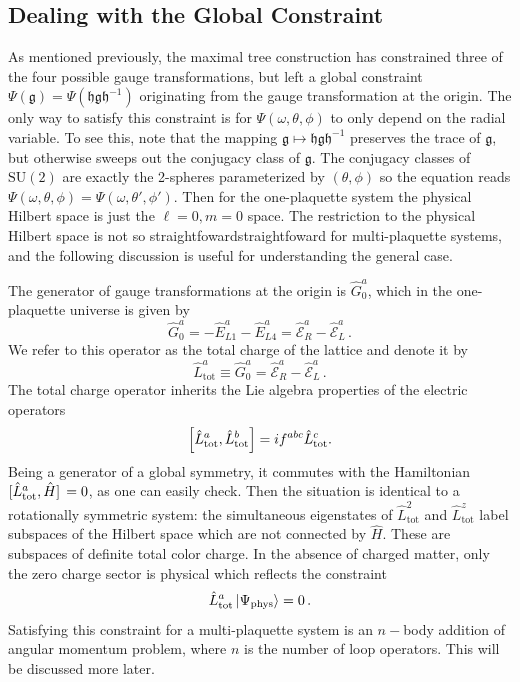 \documentclass[reprint,superscriptaddress,pra,nofootinbib,preprintnumbers,floatfix]{revtex4-1}
\providecommand{\sutwo}{$\mathrm{SU}(2)$\xspace}
\providecommand{\g}{{\mathfrak{g}}}
\providecommand{\h}{{\mathfrak{h}}}
\begin{document}
\subsection{Dealing with the Global Constraint}


As mentioned previously, the maximal tree construction has constrained three of the four possible gauge transformations, but left a global constraint $\Psi(\g) = \Psi(\h\g\h^{-1})$ originating from the gauge transformation at the origin. 
%
The only way to satisfy this constraint is for $\Psi(\omega,\theta,\phi)$ to only depend on the radial variable. 
%
To see this, note that the mapping $\g \mapsto \h\g\h^{-1}$ preserves the trace of $\g$, but otherwise sweeps out the conjugacy class of $\g$. 
%
The conjugacy classes of \sutwo are exactly the 2-spheres parameterized by $(\theta,\phi)$ so the equation reads $\Psi(\omega,\theta,\phi) = \Psi(\omega,\theta',\phi')$.  
%
Then for the one-plaquette system the physical Hilbert space is just the $\ell=0,m=0$ space. 
%
The restriction to the physical Hilbert space is not so straightfowardstraightfoward for multi-plaquette systems, and the following discussion is useful for understanding the general case.   



The generator of gauge transformations at the origin is $\hat{G}_0^a$, which in the one-plaquette universe is given by
%
\begin{equation}
    \hat{G}_0^a = - \hat{E}^a_{L1} - \hat{E}^a_{L4} = \hat{\mathcal{E}}^a_R - \hat{\mathcal{E}}^a_L \,.
\end{equation}
%
We refer to this operator as the total charge of the lattice and denote it by
%
\begin{equation}
    \hat{L}_\mathrm{tot}^a \equiv \hat{G}_0^a = \hat{\mathcal{E}}^a_R - \hat{\mathcal{E}}^a_L \,.
\end{equation}
%
The total charge operator inherits the Lie algebra properties of the electric operators
%
\begin{equation}\label{eq:LL_commutator}
  \comm{\hat{L}_\mathrm{tot}^a}{\hat{L}_\mathrm{tot}^b} = i f^{abc} \hat{L}_\mathrm{tot}^c.
\end{equation}
%
Being a generator of a global symmetry, it commutes with the Hamiltonian $\comm*{\hat{L}_\mathrm{tot}^a}{\hat{H}} = 0$, as one can easily check. 
%
Then the situation is identical to a rotationally symmetric system: the simultaneous eigenstates of $\hat{L}_\mathrm{tot}^2$ and $\hat{L}_\mathrm{tot}^z$ label subspaces of the Hilbert space which are not connected by $\hat{H}$. 
%
These are subspaces of definite total color charge. In the absence of charged matter, only the zero charge sector is physical which reflects the constraint
%
\begin{equation}
  \hat{L}^a_\mathrm{tot} \ket{\Psi_\text{phys}} = 0 \,.
\end{equation}
%
Satisfying this constraint for a multi-plaquette system is an $n-$body addition of angular momentum problem, where $n$ is the number of loop operators. 
%
This will be discussed more later.
\end{document}
